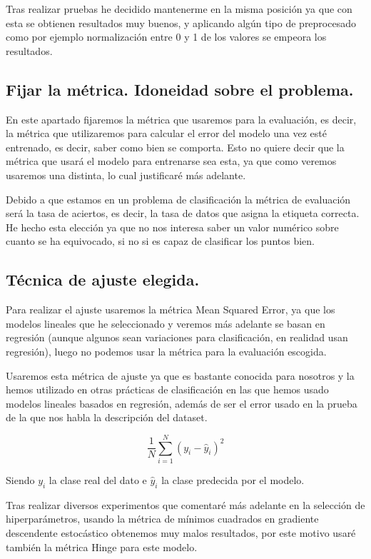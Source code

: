 \documentclass[12pt, spanish]{article}
\begin{document}
Tras realizar pruebas he decidido mantenerme en la misma posición ya que con esta se obtienen resultados muy buenos, y aplicando algún tipo de preprocesado como por ejemplo normalización entre 0 y 1 de los valores se empeora los resultados.

\subsection{Fijar la métrica. Idoneidad sobre el problema.}

En este apartado fijaremos la métrica que usaremos para la evaluación, es decir, la métrica que utilizaremos para calcular el error del modelo una vez esté entrenado, es decir, saber como bien se comporta. Esto no quiere decir que la métrica que usará el modelo para entrenarse sea esta, ya que como veremos usaremos una distinta, lo cual justificaré más adelante.

Debido a que estamos en un problema de clasificación la métrica de evaluación será la tasa de aciertos, es decir, la tasa de datos que asigna la etiqueta correcta. He hecho esta elección ya que no nos interesa saber un valor numérico sobre cuanto se ha equivocado, si no si es capaz de clasificar los puntos bien.



\subsection{Técnica de ajuste elegida.}

Para realizar el ajuste usaremos la métrica Mean Squared Error, ya que los modelos lineales que he seleccionado y veremos más adelante se basan en regresión (aunque algunos sean variaciones para clasificación, en realidad usan regresión), luego no podemos usar la métrica para la evaluación escogida. 

Usaremos esta métrica de ajuste ya que es bastante conocida para nosotros y la hemos utilizado en otras prácticas de clasificación en las que hemos usado modelos lineales basados en regresión, además de ser el error usado en la prueba de la que nos habla la descripción del dataset.


$$ \frac{1}{N} \sum_{i=1}^{N}{(y_i - \hat{y}_i)^2} $$

Siendo $y_i$ la clase real del dato e $\hat{y}_i$ la clase predecida por el modelo.

Tras realizar diversos experimentos que comentaré más adelante en la selección de hiperparámetros, usando la métrica de mínimos cuadrados en gradiente descendente estocástico obtenemos muy malos resultados, por este motivo usaré también la métrica Hinge\cite{hingeLoss} para este modelo.
\end{document}
